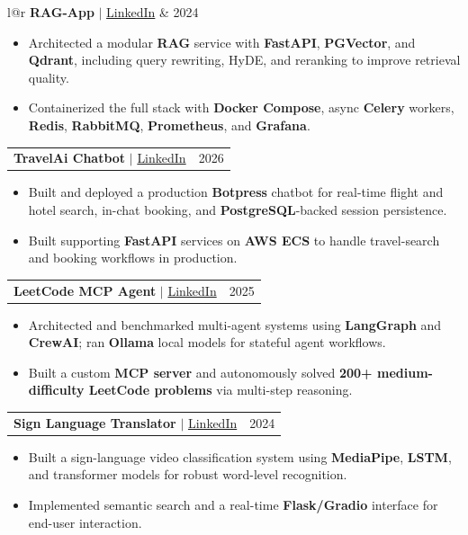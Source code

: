 \documentclass[letterpaper,11pt]{article}
\makeatletter
\newcommand{\resumeItem}[1]{
  \item\small{
    {#1 \vspace{-1pt}}
  }
}
\newcommand{\resumeProjectHeading}[2]{
    \item
    \begin{tabular*}{\textwidth}{l@{\extracolsep{\fill}}r}
      #1 & {\color{dark-grey}\small #2} \\
    \end{tabular*}\vspace{-4pt}
}
\newcommand{\resumeItemListStart}{\begin{itemize}}
\newcommand{\resumeItemListEnd}{\end{itemize}\vspace{0pt}}
\makeatother
\begin{document}
      \resumeProjectHeading
          {\textbf{RAG-App} \textnormal{\small $|$ \href{\detokenize{https://www.linkedin.com/posts/ahm215_rag-llm-genai-ugcPost-7459016528022155264-gLIT?utm_source=share&utm_medium=member_desktop&rcm=ACoAADYmHWIBf4XZO2d5xNvZ54mqll1Tcll-uRA}}{LinkedIn}}}{2024}
          \resumeItemListStart
                \resumeItem{Architected a modular \textbf{RAG} service with \textbf{FastAPI}, \textbf{PGVector}, and \textbf{Qdrant}, including query rewriting, HyDE, and reranking to improve retrieval quality.}
                \resumeItem{Containerized the full stack with \textbf{Docker Compose}, async \textbf{Celery} workers, \textbf{Redis}, \textbf{RabbitMQ}, \textbf{Prometheus}, and \textbf{Grafana}.}
            \resumeItemListEnd
            
      \resumeProjectHeading
          {\textbf{TravelAi Chatbot} \textnormal{\small $|$ \href{https://tinyurl.com/y6hfejvw}{LinkedIn}}}{2026}
          \resumeItemListStart
            \resumeItem{Built and deployed a production \textbf{Botpress} chatbot for real-time flight and hotel search, in-chat booking, and \textbf{PostgreSQL}-backed session persistence.}
            \resumeItem{Built supporting \textbf{FastAPI} services on \textbf{AWS ECS} to handle travel-search and booking workflows in production.}
          \resumeItemListEnd 
          
      \resumeProjectHeading
          {\textbf{LeetCode MCP Agent} \textnormal{\small $|$ \href{https://www.linkedin.com/posts/ahm215_ai-machinelearning-crewai-activity-7349437367713202177-a8Lv}{LinkedIn}}}{2025}
          \resumeItemListStart
            \resumeItem{Architected and benchmarked multi-agent systems using \textbf{LangGraph} and \textbf{CrewAI}; ran \textbf{Ollama} local models for stateful agent workflows.}
            \resumeItem{Built a custom \textbf{MCP server} and autonomously solved \textbf{200+ medium-difficulty LeetCode problems} via multi-step reasoning.}
          \resumeItemListEnd

      \resumeProjectHeading
          {\textbf{Sign Language Translator} \textnormal{\small $|$ \href{https://www.linkedin.com/posts/sarakhataam_signlanguage-computervision-ai-ugcPost-7225870786018893824-F43u}{LinkedIn}}}{2024}
          \resumeItemListStart
            \resumeItem{Built a sign-language video classification system using \textbf{MediaPipe}, \textbf{LSTM}, and transformer models for robust word-level recognition.}
            \resumeItem{Implemented semantic search and a real-time \textbf{Flask/Gradio} interface for end-user interaction.}
          \resumeItemListEnd
\end{document}

